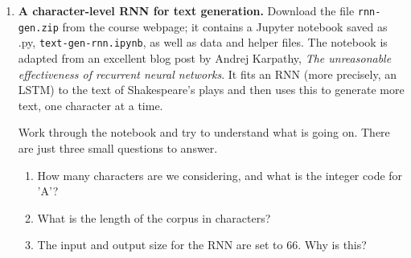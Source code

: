 \documentclass{article}
\begin{document}
\begin{enumerate}
\item \textbf{A character-level RNN for text generation.} Download the file \texttt{rnn-gen.zip} from the course webpage; it contains a Jupyter notebook saved as .py, \texttt{text-gen-rnn.ipynb}, as well as data and helper files. The notebook is adapted from an excellent blog post by Andrej Karpathy, \textit{The unreasonable effectiveness of recurrent neural networks}. It fits an RNN (more precisely, an LSTM) to the text of Shakespeare's plays and then uses this to generate more text, one character at a time.

Work through the notebook and try to understand what is going on. There are just three small questions to answer.

\begin{enumerate}
\item How many characters are we considering, and what is the integer code for 'A'?
\item What is the length of the corpus in characters?
\item The input and output size for the RNN are set to 66. Why is this?
\end{enumerate}
\end{enumerate}
\end{document}
